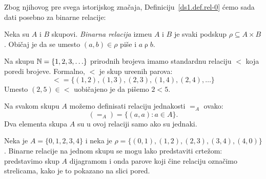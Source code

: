 Zbog njihovog pre svega istorijskog zna\v caja, Definiciju~\ref{ds1.def.rel-0} \'cemo sada dati posebno za binarne relacije:

\begin{DEF}
  Neka su $A$ i $B$ skupovi. \emph{Binarna relacija} izme\dj u $A$ i $B$ je svaki podskup
  $
    \rho \subseteq A \times B
  $.
  Obi\v caj je da se umesto $(a, b) \in \rho$ pi\v se i $a \mathrel{\rho} b$.
\end{DEF}

\begin{EX}
  Na skupu $\mathbb{N} = \{1, 2, 3, \ldots\}$ prirodnih brojeva imamo standardnu relaciju $<$ koja poredi brojeve.
  Formalno, $<$ je skup ure\dj enih parova:
  $$
    \mbox{$<$} = \{ (1, 2), (1, 3), (2, 3), (1, 4), (2, 4), \ldots \}
  $$
  Umesto $(2, 5) \in \mbox{$<$}$ uobi\v cajeno je da pi\v semo $2 < 5$.
\end{EX}

\begin{EX}
  Na svakom skupu $A$ mo\v zemo definisati relaciju jednakosti $=_A$ ovako:
  $$
    (\mbox{$=_A$}) = \{ (a, a) : a \in A \}.
  $$
  Dva elementa skupa $A$ su u ovoj relaciji samo ako su jednaki.
\end{EX}

\medskip

\noindent
\begin{minipage}{3in}
  \begin{EX}\label{ft07.ex.01}
    Neka je $A = \{0, 1, 2, 3, 4\}$ i neka je $\rho = \{(0,1), (1,2), (2,3), (3,4), (4,0)\}$.
    Binarne relacije na jednom skupu se mogu lako predstaviti crte\v zom: predstavimo skup $A$ dijagramom
    i onda parove koji \v cine relaciju ozna\v cimo strelicama, kako je to pokazano na slici pored.
  \end{EX}
\end{minipage}
\hfill
\begin{minipage}{2.5in}
  \begin{center}
    
  \end{center}
\end{minipage}

\medskip

